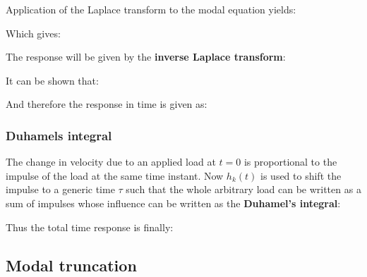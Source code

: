 \documentclass[10pt,a4paper]{scrartcl}
\begin{document}
\begin{multicols*}{2}
Application of the Laplace transform to the modal equation yields:


Which gives:


The response will be given by the \textbf{inverse Laplace transform}:


It can be shown that:


And therefore the response in time is given as:


\subsubsection{Duhamels integral}


The change in velocity due to an applied load at $t=0$ is proportional to the impulse of the load at the same time instant. Now $h_k(t)$ is used to shift the impulse to a generic time $\tau$ such that the whole arbitrary load can be written as a sum of impulses whose influence can be written as the \textbf{Duhamel's integral}:



Thus the total time response is finally:


\subsection{Modal truncation}


\end{multicols*}
\end{document}
